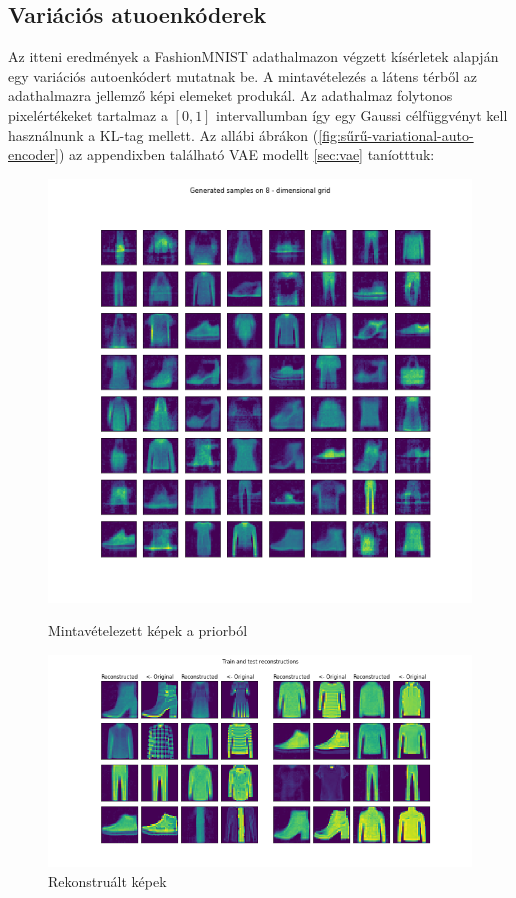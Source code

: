 \documentclass[12pt, english]{article}
\begin{document}
\newpage

\subsection{Variációs atuoenkóderek}

\vspace{5mm}

\par Az itteni eredmények a FashionMNIST adathalmazon végzett kísérletek alapján egy variációs autoenkódert mutatnak be. A mintavételezés a látens térből az adathalmazra jellemző képi elemeket produkál. Az adathalmaz folytonos pixelértékeket tartalmaz a $[0, 1]$ intervallumban így egy Gaussi célfüggvényt kell használnunk a KL-tag mellett. Az allábi ábrákon (\ref{fig:sűrű-variational-auto-encoder}) az appendixben található VAE modellt \ref{sec:vae} taníotttuk:

\vspace{4mm}

\begin{figure}[ht] 
  \label{fig:auto_encoder_results} 
  \begin{minipage}{0.5\linewidth}
    \centering
    \includegraphics[width=.65\linewidth]{gen/generated_samples_fashion_mnist_dense_vae.png} 
    \caption{Mintavételezett képek a priorból} 
  \end{minipage}%
  \begin{minipage}{0.5\linewidth}
    \centering
    \includegraphics[width=.95\linewidth]{reco/reconstrunction_samples_fashion_mnist_dense_vae.png} 
    \caption{Rekonstruált képek} 
  \end{minipage} 
\end{figure}
\end{document}
